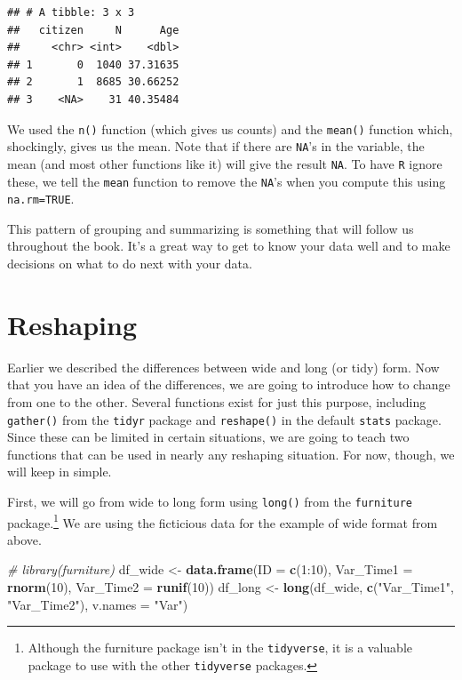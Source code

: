 \documentclass[]{tufte-book}
\newenvironment{Shaded}{}{}
\newcommand{\KeywordTok}[1]{\textcolor[rgb]{0.00,0.44,0.13}{\textbf{#1}}}
\newcommand{\DataTypeTok}[1]{\textcolor[rgb]{0.56,0.13,0.00}{#1}}
\newcommand{\DecValTok}[1]{\textcolor[rgb]{0.25,0.63,0.44}{#1}}
\newcommand{\StringTok}[1]{\textcolor[rgb]{0.25,0.44,0.63}{#1}}
\newcommand{\CommentTok}[1]{\textcolor[rgb]{0.38,0.63,0.69}{\textit{#1}}}
\newcommand{\OperatorTok}[1]{\textcolor[rgb]{0.40,0.40,0.40}{#1}}
\newcommand{\NormalTok}[1]{#1}
\theoremstyle{definition}
\theoremstyle{definition}
\theoremstyle{remark}
\begin{document}
\begin{verbatim}
## # A tibble: 3 x 3
##   citizen     N      Age
##     <chr> <int>    <dbl>
## 1       0  1040 37.31635
## 2       1  8685 30.66252
## 3    <NA>    31 40.35484
\end{verbatim}

We used the \texttt{n()} function (which gives us counts) and the
\texttt{mean()} function which, shockingly, gives us the mean. Note that
if there are \texttt{NA}'s in the variable, the mean (and most other
functions like it) will give the result \texttt{NA}. To have \texttt{R}
ignore these, we tell the \texttt{mean} function to remove the
\texttt{NA}'s when you compute this using \texttt{na.rm=TRUE}.

This pattern of grouping and summarizing is something that will follow
us throughout the book. It's a great way to get to know your data well
and to make decisions on what to do next with your data.

\section*{Reshaping}\label{reshaping}

Earlier we described the differences between wide and long (or tidy)
form. Now that you have an idea of the differences, we are going to
introduce how to change from one to the other. Several functions exist
for just this purpose, including \texttt{gather()} from the
\texttt{tidyr} package and \texttt{reshape()} in the default
\texttt{stats} package. Since these can be limited in certain
situations, we are going to teach two functions that can be used in
nearly any reshaping situation. For now, though, we will keep in simple.

First, we will go from wide to long form using \texttt{long()} from the
\texttt{furniture} package.\footnote{Although the furniture package
  isn't in the \texttt{tidyverse}, it is a valuable package to use with
  the other \texttt{tidyverse} packages.} We are using the ficticious
data for the example of wide format from above.

\begin{Shaded}
\begin{Highlighting}[]
\CommentTok{# library(furniture)}
\NormalTok{df_wide <-}\StringTok{ }\KeywordTok{data.frame}\NormalTok{(}\DataTypeTok{ID =} \KeywordTok{c}\NormalTok{(}\DecValTok{1}\OperatorTok{:}\DecValTok{10}\NormalTok{), }\DataTypeTok{Var_Time1 =} \KeywordTok{rnorm}\NormalTok{(}\DecValTok{10}\NormalTok{), }
    \DataTypeTok{Var_Time2 =} \KeywordTok{runif}\NormalTok{(}\DecValTok{10}\NormalTok{))}
\NormalTok{df_long <-}\StringTok{ }\KeywordTok{long}\NormalTok{(df_wide, }\KeywordTok{c}\NormalTok{(}\StringTok{"Var_Time1"}\NormalTok{, }\StringTok{"Var_Time2"}\NormalTok{), }
    \DataTypeTok{v.names =} \StringTok{"Var"}\NormalTok{)}
\end{Highlighting}
\end{Shaded}
\end{document}
